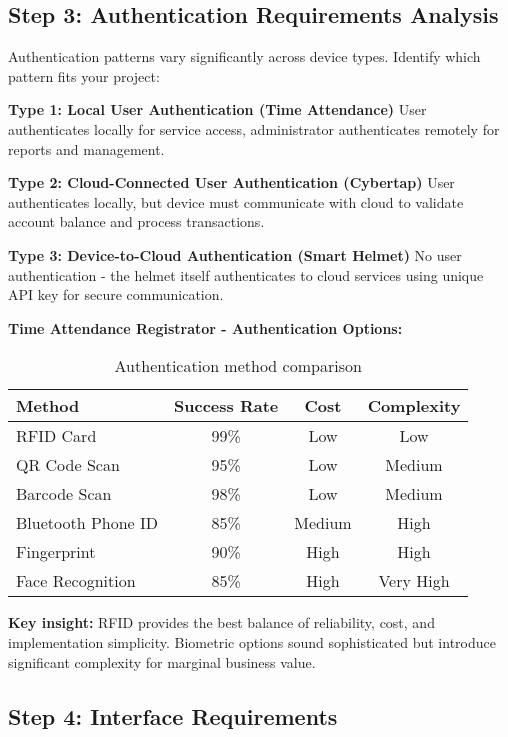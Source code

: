 \subsection{Step 3: Authentication Requirements Analysis}

Authentication patterns vary significantly across device types. Identify which pattern fits your project:

\textbf{Type 1: Local User Authentication (Time Attendance)}
User authenticates locally for service access, administrator authenticates remotely for reports and management.

\textbf{Type 2: Cloud-Connected User Authentication (Cybertap)}
User authenticates locally, but device must communicate with cloud to validate account balance and process transactions.

\textbf{Type 3: Device-to-Cloud Authentication (Smart Helmet)}
No user authentication - the helmet itself authenticates to cloud services using unique API key for secure communication.

\textbf{Time Attendance Registrator - Authentication Options:}

\begin{table}[h]
\centering
\begin{tabular}{|l|c|c|c|}
\hline
\textbf{Method} & \textbf{Success Rate} & \textbf{Cost} & \textbf{Complexity} \\
\hline
RFID Card & 99\% & Low & Low \\
QR Code Scan & 95\% & Low & Medium \\
Barcode Scan & 98\% & Low & Medium \\
Bluetooth Phone ID & 85\% & Medium & High \\
Fingerprint & 90\% & High & High \\
Face Recognition & 85\% & High & Very High \\
\hline
\end{tabular}
\caption{Authentication method comparison}
\end{table}

\textbf{Key insight:} RFID provides the best balance of reliability, cost, and implementation simplicity. Biometric options sound sophisticated but introduce significant complexity for marginal business value.


\subsection{Step 4: Interface Requirements}

